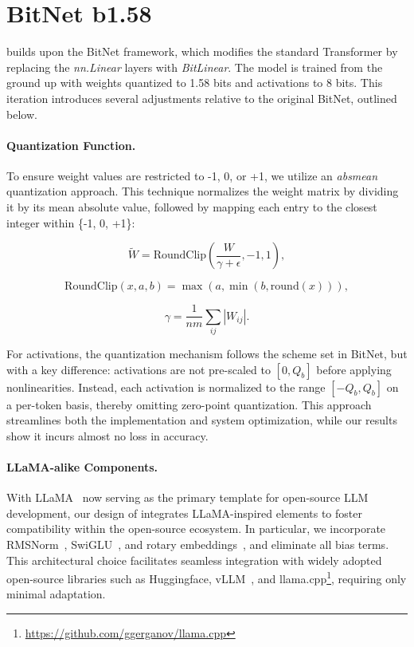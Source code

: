 \section{BitNet b1.58}

 builds upon the BitNet framework, which modifies the standard Transformer by replacing the \emph{nn.Linear} layers with \emph{BitLinear}. The model is trained from the ground up with weights quantized to 1.58 bits and activations to 8 bits. This iteration introduces several adjustments relative to the original BitNet, outlined below.

\paragraph{Quantization Function.} To ensure weight values are restricted to -1, 0, or +1, we utilize an \emph{absmean} quantization approach. This technique normalizes the weight matrix by dividing it by its mean absolute value, followed by mapping each entry to the closest integer within \{-1, 0, +1\}:

\begin{equation}
    \widetilde{W} = \mathrm{RoundClip}(\frac{W}{\gamma + \epsilon}, -1, 1),
\end{equation}

\begin{equation}
    \mathrm{RoundClip}(x, a, b) = \max(a, \min(b, \mathrm{round}(x))),
\end{equation}

\begin{equation}
    \gamma = \frac{1}{nm}\sum_{ij} |W_{ij}|.
\end{equation}

For activations, the quantization mechanism follows the scheme set in BitNet, but with a key difference: activations are not pre-scaled to $[0, Q_b]$ before applying nonlinearities. Instead, each activation is normalized to the range $[-Q_b, Q_b]$ on a per-token basis, thereby omitting zero-point quantization. This approach streamlines both the implementation and system optimization, while our results show it incurs almost no loss in accuracy.

\paragraph{LLaMA-alike Components.}

With LLaMA~\cite{llama, llama2} now serving as the primary template for open-source LLM development, our design of  integrates LLaMA-inspired elements to foster compatibility within the open-source ecosystem. In particular, we incorporate RMSNorm~\cite{rmsnorm}, SwiGLU~\cite{swiglu}, and rotary embeddings~\cite{rope}, and eliminate all bias terms. This architectural choice facilitates seamless integration with widely adopted open-source libraries such as Huggingface, vLLM~\cite{vllm}, and llama.cpp\footnote{\url{https://github.com/ggerganov/llama.cpp}}, requiring only minimal adaptation.


